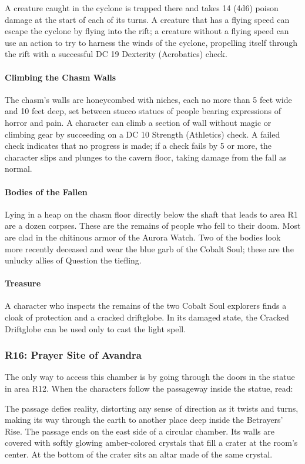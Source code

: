 \documentclass[10pt,a4paper,twoside,twocolumn,openany,nodeprecatedcode]{dndbook}
\begin{document}
A creature caught in the cyclone is trapped there and takes 14 (4d6) poison damage at the start of each of its turns. A creature that has a flying speed can escape the cyclone by flying into the rift; a creature without a flying speed can use an action to try to harness the winds of the cyclone, propelling itself through the rift with a successful DC 19 Dexterity (Acrobatics) check.

\paragraph{Climbing the Chasm Walls}
The chasm's walls are honeycombed with niches, each no more than 5 feet wide and 10 feet deep, set between stucco statues of people bearing expressions of horror and pain. A character can climb a section of wall without magic or climbing gear by succeeding on a DC 10 Strength (Athletics) check. A failed check indicates that no progress is made; if a check fails by 5 or more, the character slips and plunges to the cavern floor, taking damage from the fall as normal.

\paragraph{Bodies of the Fallen}
Lying in a heap on the chasm floor directly below the shaft that leads to area R1 are a dozen corpses. These are the remains of people who fell to their doom. Most are clad in the chitinous armor of the Aurora Watch. Two of the bodies look more recently deceased and wear the blue garb of the Cobalt Soul; these are the unlucky allies of Question the tiefling.

\paragraph{Treasure}
A character who inspects the remains of the two Cobalt Soul explorers finds a cloak of protection and a cracked driftglobe. In its damaged state, the Cracked Driftglobe can be used only to cast the light spell.

\subsubsection{R16: Prayer Site of Avandra}
The only way to access this chamber is by going through the doors in the statue in area R12. When the characters follow the passageway inside the statue, read:

\begin{DndReadAloud}{}
The passage defies reality, distorting any sense of direction as it twists and turns, making its way through the earth to another place deep inside the Betrayers' Rise. The passage ends on the east side of a circular chamber. Its walls are covered with softly glowing amber-colored crystals that fill a crater at the room's center. At the bottom of the crater sits an altar made of the same crystal.

\end{DndReadAloud}
\end{document}
